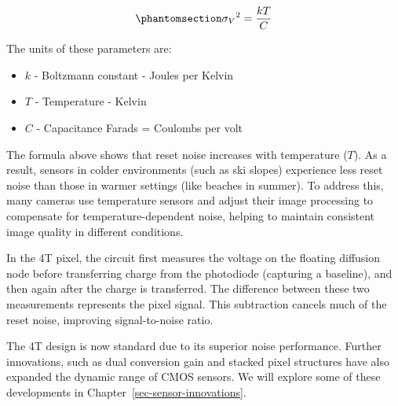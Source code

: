 \documentclass[
  letterpaper,
]{book}
\providecommand{\tightlist}{%
  \setlength{\itemsep}{0pt}\setlength{\parskip}{0pt}}\usepackage{longtable,booktabs,array}
\begin{document}
\begin{equation}\phantomsection\label{eq-ktc-volts}{
{\sigma_V}^2 = \frac{kT}{C}
}\end{equation}

The units of these parameters are:

\begin{itemize}
\tightlist
\item
  \(k\) - Boltzmann constant - Joules per Kelvin
\item
  \(T\) - Temperature - Kelvin
\item
  \(C\) - Capacitance Farads = Coulombs per volt
\end{itemize}

The formula above shows that reset noise increases with temperature
(\(T\)). As a result, sensors in colder environments (such as ski
slopes) experience less reset noise than those in warmer settings (like
beaches in summer). To address this, many cameras use temperature
sensors and adjust their image processing to compensate for
temperature-dependent noise, helping to maintain consistent image
quality in different conditions.

In the 4T pixel, the circuit first measures the voltage on the floating
diffusion node before transferring charge from the photodiode (capturing
a baseline), and then again after the charge is transferred. The
difference between these two measurements represents the pixel signal.
This subtraction cancels much of the reset noise, improving
signal-to-noise ratio.

The 4T design is now standard due to its superior noise performance.
Further innovations, such as dual conversion gain and stacked pixel
structures have also expanded the dynamic range of CMOS sensors. We will
explore some of these developments in
Chapter~\ref{sec-sensor-innovations}.
\end{document}
